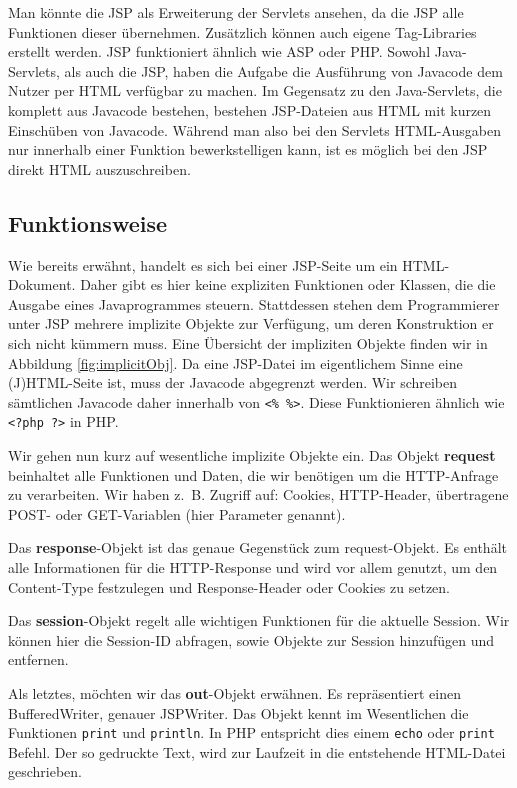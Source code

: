 Man könnte die JSP als Erweiterung der Servlets ansehen, da die JSP alle Funktionen dieser übernehmen. Zusätzlich können auch eigene Tag-Libraries erstellt werden. JSP funktioniert ähnlich wie ASP oder PHP. Sowohl Java-Servlets, als auch die JSP, haben die Aufgabe die Ausführung von Javacode dem Nutzer  per HTML verfügbar zu machen. Im Gegensatz zu den Java-Servlets, die komplett aus Javacode bestehen, bestehen JSP-Dateien aus HTML mit kurzen Einschüben von Javacode. Während man also bei den Servlets HTML-Ausgaben nur innerhalb einer Funktion bewerkstelligen kann, ist es möglich bei den JSP direkt HTML auszuschreiben.

\subsection{Funktionsweise}

Wie bereits erwähnt, handelt es sich bei einer JSP-Seite um ein HTML-Dokument. Daher gibt es hier keine expliziten Funktionen oder Klassen, die die Ausgabe eines Javaprogrammes steuern. Stattdessen stehen dem Programmierer unter JSP mehrere implizite Objekte zur Verfügung, um deren Konstruktion er sich nicht kümmern muss. Eine Übersicht der impliziten Objekte finden wir in Abbildung \ref{fig:implicitObj}. Da eine JSP-Datei im eigentlichem Sinne eine (J)HTML-Seite ist, muss der Javacode abgegrenzt werden. Wir schreiben sämtlichen Javacode daher innerhalb von \verb|<% %>|. Diese Funktionieren ähnlich wie \verb|<?php ?>| in PHP.

Wir gehen nun kurz auf wesentliche implizite Objekte ein. Das Objekt \textbf{request} beinhaltet alle Funktionen und Daten, die wir benötigen um die HTTP-Anfrage zu verarbeiten. Wir haben \mbox{z. B.} Zugriff auf: Cookies, HTTP-Header, übertragene POST- oder GET-Variablen (hier Parameter genannt).

Das \textbf{response}-Objekt ist das genaue Gegenstück zum request-Objekt. Es enthält alle Informationen für die HTTP-Response und wird vor allem genutzt, um den Content-Type festzulegen und Response-Header oder Cookies zu setzen. 

Das \textbf{session}-Objekt regelt alle wichtigen Funktionen für die aktuelle Session. Wir können hier die Session-ID abfragen, sowie Objekte zur Session hinzufügen und entfernen.

Als letztes, möchten wir das \textbf{out}-Objekt erwähnen. Es repräsentiert einen BufferedWriter, genauer JSPWriter. Das Objekt kennt im Wesentlichen die Funktionen \verb|print| und \verb|println|. In PHP entspricht dies einem \verb|echo| oder \verb|print| Befehl. Der so gedruckte Text, wird zur Laufzeit in die entstehende HTML-Datei geschrieben. 

